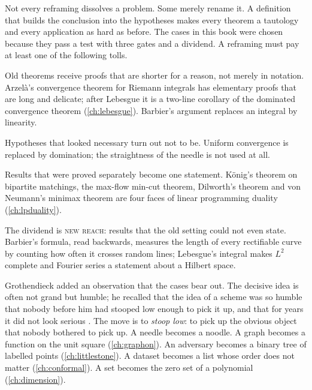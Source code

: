 \begin{refsection}

Not every reframing dissolves a problem. Some merely rename it. A definition that builds the conclusion into the hypotheses makes every theorem a tautology and every application as hard as before. The cases in this book were chosen because they pass a test with three gates and a dividend. A reframing must pay at least one of the following tolls.

\begin{description}[leftmargin=1.2em,style=nextline,font=\normalfont\scshape\color{sea}]
\item[Shorter proofs.] Old theorems receive proofs that are shorter for a reason, not merely in notation. Arzel\`a's convergence theorem for Riemann integrals has elementary proofs that are long and delicate; after Lebesgue it is a two-line corollary of the dominated convergence theorem (\cref{ch:lebesgue}). Barbier's argument replaces an integral by linearity.
\item[Fewer assumptions.] Hypotheses that looked necessary turn out not to be. Uniform convergence is replaced by domination; the straightness of the needle is not used at all.
\item[Unification.] Results that were proved separately become one statement. K\"onig's theorem on bipartite matchings, the max-flow min-cut theorem, Dilworth's theorem and von Neumann's minimax theorem are four faces of linear programming duality (\cref{ch:lpduality}).
\end{description}

\noindent The dividend is \textsc{new reach}: results that the old setting could not even state. Barbier's formula, read backwards, measures the length of every rectifiable curve by counting how often it crosses random lines; Lebesgue's integral makes $L^2$ complete and Fourier series a statement about a Hilbert space.

Grothendieck added an observation that the cases bear out. The decisive idea is often not grand but humble; he recalled that the idea of a scheme was so humble that nobody before him had stooped low enough to pick it up, and that for years it did not look serious \parencite{Grothendieck2022}. The move is to \emph{stoop low}: to pick up the obvious object that nobody bothered to pick up. A needle becomes a noodle. A graph becomes a function on the unit square (\cref{ch:graphon}). An adversary becomes a binary tree of labelled points (\cref{ch:littlestone}). A dataset becomes a list whose order does not matter (\cref{ch:conformal}). A set becomes the zero set of a polynomial (\cref{ch:dimension}).


\end{refsection}
